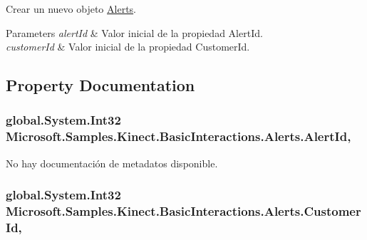 Crear un nuevo objeto \hyperlink{class_microsoft_1_1_samples_1_1_kinect_1_1_basic_interactions_1_1_alerts}{Alerts}. 


\begin{DoxyParams}{Parameters}
{\em alert\-Id} & Valor inicial de la propiedad Alert\-Id.\\
\hline
{\em customer\-Id} & Valor inicial de la propiedad Customer\-Id.\\
\hline
\end{DoxyParams}


\subsection{Property Documentation}
\hypertarget{class_microsoft_1_1_samples_1_1_kinect_1_1_basic_interactions_1_1_alerts_a307902da0031e223291d2f501d3d4493}{
\subsubsection[{Alert\-Id}]{\setlength{\rightskip}{0pt plus 5cm}global.\-System.\-Int32 Microsoft.\-Samples.\-Kinect.\-Basic\-Interactions.\-Alerts.\-Alert\-Id\hspace{0.3cm}{\ttfamily [get]}, {\ttfamily [set]}}}\label{class_microsoft_1_1_samples_1_1_kinect_1_1_basic_interactions_1_1_alerts_a307902da0031e223291d2f501d3d4493}


No hay documentación de metadatos disponible. 

\hypertarget{class_microsoft_1_1_samples_1_1_kinect_1_1_basic_interactions_1_1_alerts_a7d791daf8c1807d839b9382c51734144}{
\subsubsection[{Customer\-Id}]{\setlength{\rightskip}{0pt plus 5cm}global.\-System.\-Int32 Microsoft.\-Samples.\-Kinect.\-Basic\-Interactions.\-Alerts.\-Customer\-Id\hspace{0.3cm}{\ttfamily [get]}, {\ttfamily [set]}}}\label{class_microsoft_1_1_samples_1_1_kinect_1_1_basic_interactions_1_1_alerts_a7d791daf8c1807d839b9382c51734144}


